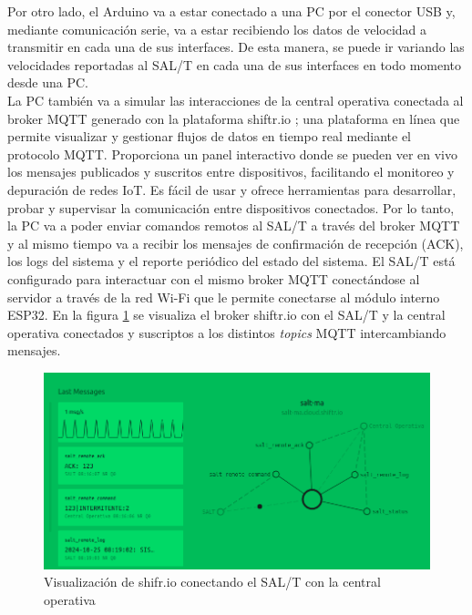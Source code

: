 Por otro lado, el Arduino va a estar conectado a una PC por el conector USB y, mediante comunicación serie, va a estar recibiendo los datos de velocidad a transmitir en cada una de sus interfaces. De esta manera, se puede ir variando las velocidades reportadas al SAL/T en cada una de sus interfaces en todo momento desde una PC. \\ 


La PC también va a simular las interacciones de la central operativa conectada al broker MQTT generado con la plataforma shiftr.io \cite{shifrio}; una plataforma en línea que permite visualizar y gestionar flujos de datos en tiempo real mediante el protocolo MQTT. Proporciona un panel interactivo donde se pueden ver en vivo los mensajes publicados y suscritos entre dispositivos, facilitando el monitoreo y depuración de redes IoT. Es fácil de usar y ofrece herramientas para desarrollar, probar y supervisar la comunicación entre dispositivos conectados. Por lo tanto, la PC va a poder enviar comandos remotos al SAL/T a través del broker MQTT y al mismo tiempo va a recibir los mensajes de confirmación de recepción (ACK), los logs del sistema y el reporte periódico del estado del sistema. El SAL/T está configurado para interactuar con el mismo broker MQTT conectándose al servidor a través de la red Wi-Fi que le permite conectarse al módulo interno ESP32. En la figura \ref{fig:shiftrio}
se visualiza el broker shiftr.io con el SAL/T y la central operativa conectados y suscriptos a los distintos \textit{topics} MQTT intercambiando mensajes.



\begin{figure}[H]
    \centering
    \includegraphics[width = \linewidth]{img/shiftrio.png}
    \caption{Visualización de shifr.io conectando el SAL/T con la central operativa}
    \label{fig:shiftrio}
\end{figure}






